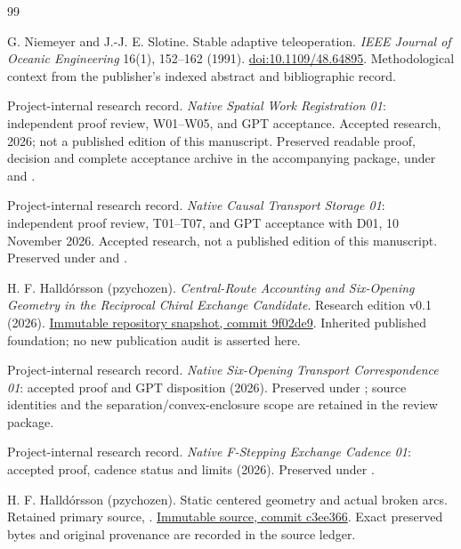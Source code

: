 \clearpage
{}
\begin{thebibliography}{99}
\raggedright
{} G. Niemeyer and J.-J. E. Slotine.
Stable adaptive teleoperation. \emph{IEEE Journal of Oceanic Engineering}
16(1), 152--162 (1991). \href{https://doi.org/10.1109/48.64895}{doi:10.1109/48.64895}.
Methodological context from the publisher's indexed abstract and bibliographic record.

 Project-internal research record.
\emph{Native Spatial Work Registration 01}: independent proof review, W01--W05,
and GPT acceptance. Accepted research, 2026; not a published edition of this manuscript.
Preserved readable proof, decision and complete acceptance archive in the accompanying package,
under  and .

 Project-internal research record.
\emph{Native Causal Transport Storage 01}: independent proof review, T01--T07,
and GPT acceptance with D01, 10 November 2026.
Accepted research, not a published edition of this manuscript.
Preserved under  and
.

 H. F. Halldórsson (pzychozen).
\emph{Central-Route Accounting and Six-Opening Geometry in the Reciprocal Chiral Exchange Candidate}.
Research edition v0.1 (2026).
\href{https://github.com/pzychozen/trioctagon-physics/tree/9f02de9335232da9c1732b4851199098d363198b/papers/CENTRAL_ROUTE_SIX_OPENING_CORRESPONDENCE/publication/v0.1}{Immutable repository snapshot, commit 9f02de9}.
Inherited published foundation; no new publication audit is asserted here.

 Project-internal research record.
\emph{Native Six-Opening Transport Correspondence 01}: accepted proof and GPT disposition (2026).
Preserved under ; source identities and the
separation/convex-enclosure scope are retained in the review package.

 Project-internal research record.
\emph{Native F-Stepping Exchange Cadence 01}: accepted proof, cadence status and limits (2026).
Preserved under .

 H. F. Halldórsson (pzychozen).
Static centered geometry and actual broken arcs. Retained primary source, .
\href{https://github.com/pzychozen/trioctagon-physics/blob/c3ee366bd6195bd7fa77efd0321214af4c2dc173/papers/NATIVE_INTENSITY_AND_CONDITIONAL_CARRIER_CROSSINGS/publication/v0.1/manuscript/geometry.tex}{Immutable source, commit c3ee366}.
Exact preserved bytes and original provenance are recorded in the source ledger.


\end{thebibliography}
